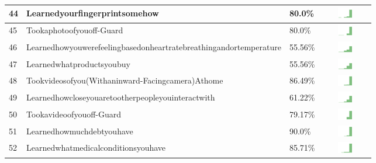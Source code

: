 \begin{table}[t]
\begin{center}
\begin{tabular}{| p{0.5cm} | p{7cm} | p{1cm} | c |}
44 & Learnedyourfingerprintsomehow & 80.0\% & \includegraphics[width = 2cm, height = 0.5cm]{../learnedyourfingerprintsomehowPUBLIC} \\ \hline 
45 & Tookaphotoofyouoff-Guard & 80.0\% & \includegraphics[width = 2cm, height = 0.5cm]{../tookaphotoofyouoff-guardPUBLIC} \\ \hline 
46 & Learnedhowyouwerefeelingbasedonheartratebreathingandortemperature & 55.56\% & \includegraphics[width = 2cm, height = 0.5cm]{../learnedhowyouwerefeelingbasedonheartratebreathingandortemperaturePUBLIC} \\ \hline 
47 & Learnedwhatproductsyoubuy & 55.56\% & \includegraphics[width = 2cm, height = 0.5cm]{../learnedwhatproductsyoubuyPUBLIC} \\ \hline 
48 & Tookvideosofyou(Withaninward-Facingcamera)Athome & 86.49\% & \includegraphics[width = 2cm, height = 0.5cm]{../tookvideosofyou(withaninward-facingcamera)athomePUBLIC} \\ \hline 
49 & Learnedhowcloseyouaretootherpeopleyouinteractwith & 61.22\% & \includegraphics[width = 2cm, height = 0.5cm]{../learnedhowcloseyouaretootherpeopleyouinteractwithPUBLIC} \\ \hline 
50 & Tookavideoofyouoff-Guard & 79.17\% & \includegraphics[width = 2cm, height = 0.5cm]{../tookavideoofyouoff-guardPUBLIC} \\ \hline 
51 & Learnedhowmuchdebtyouhave & 90.0\% & \includegraphics[width = 2cm, height = 0.5cm]{../learnedhowmuchdebtyouhavePUBLIC} \\ \hline 
52 & Learnedwhatmedicalconditionsyouhave & 85.71\% & \includegraphics[width = 2cm, height = 0.5cm]{../learnedwhatmedicalconditionsyouhavePUBLIC} \\ \hline 

\end{tabular}
\end{center}
\end{table}
